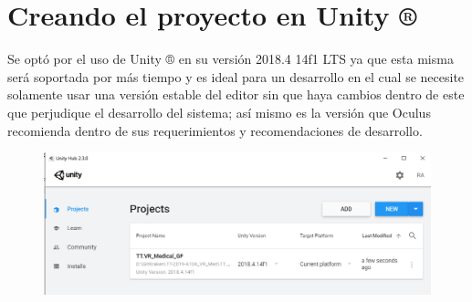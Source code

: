 \section{Creando el proyecto en Unity ®}
Se optó por el uso de Unity ® en su versión 2018.4 14f1 LTS  ya que esta misma será soportada por más tiempo y es ideal para un desarrollo en el cual se necesite solamente usar una versión estable del editor sin que haya cambios dentro de este que perjudique el desarrollo del sistema; así mismo es la versión que Oculus\cite{web15} recomienda dentro de sus requerimientos y recomendaciones de desarrollo.\\
\begin{figure}[H]
	\begin{center}
 		\includegraphics[width = 1\textwidth]{source/images/image51.png}
	\end{center} 
\end{figure}

